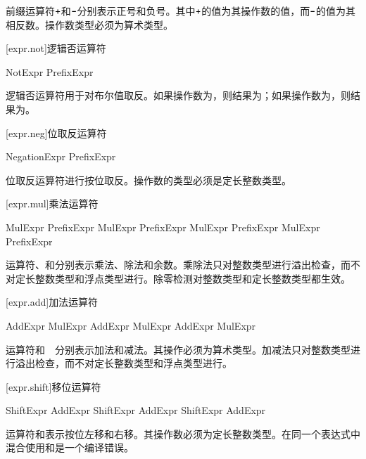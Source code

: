 \pnum
前缀运算符$\mathbin{\texttt{+}}$和$\mathbin{\texttt{-}}$分别表示正号和负号。其中$\mathbin{\texttt{+}}$的值为其操作数的值，而$\mathbin{\texttt{-}}$的值为其相反数。操作数类型必须为算术类型。

[expr.not]{逻辑否运算符}

\begin{bnf}{NotExpr}
    \terminal{!} PrefixExpr
\end{bnf}

\pnum
逻辑否运算符\tcode{!}用于对布尔值取反。如果操作数为，则结果为；如果操作数为，则结果为。

[expr.neg]{位取反运算符}

\begin{bnf}{NegationExpr}
     PrefixExpr
\end{bnf}

\pnum
位取反运算符进行按位取反。操作数的类型必须是定长整数类型。

[expr.mul]{乘法运算符}

\begin{bnf}{MulExpr}
    PrefixExpr \br
    MulExpr \terminal{*} PrefixExpr \br
    MulExpr \terminal{/} PrefixExpr \br
    MulExpr \terminal{\%} PrefixExpr
\end{bnf}

\pnum
运算符\tcode{*}、\tcode{/}和\tcode{\%}分别表示乘法、除法和余数。乘除法只对整数类型进行溢出检查，而不对定长整数类型和浮点类型进行。除零检测对整数类型和定长整数类型都生效。

[expr.add]{加法运算符}

\begin{bnf}{AddExpr}
    MulExpr \br
    AddExpr \terminal{+} MulExpr \br
    AddExpr \terminal{-} MulExpr
\end{bnf}

\pnum
运算符\tcode{+}和\ \tcode{-}\ 分别表示加法和减法。其操作必须为算术类型。加减法只对整数类型进行溢出检查，而不对定长整数类型和浮点类型进行。

[expr.shift]{移位运算符}

\begin{bnf}{ShiftExpr}
    AddExpr \br
    ShiftExpr  AddExpr \br
    ShiftExpr  AddExpr
\end{bnf}

\pnum
运算符和表示按位左移和右移。其操作数必须为定长整数类型。在同一个表达式中混合使用和是一个编译错误。

